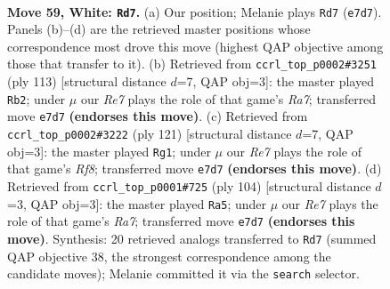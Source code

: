 \documentclass[11pt]{article}
\begin{document}
\clearpage

\begin{figure}[p]\centering
\begin{subfigure}{0.46\textwidth}\centering
\resizebox{\linewidth}{!}{%
\newchessgame
\chessboard[
  setfen={5rk1/4R3/P7/8/8/7K/8/8 w - - 3 59},
  showmover=false,
  pgfstyle=straightmove, color=movearrow, markmove={e7-d7}
]}
\caption{}
\end{subfigure}\hfill
\begin{subfigure}{0.46\textwidth}\centering
\resizebox{\linewidth}{!}{%
\newchessgame
\chessboard[
  setfen={8/8/8/5k1p/7P/8/r7/6RK b - - 4 57},
  showmover=false,
  pgfstyle=straightmove, color=movearrow, markmove={a2-b2}
]}
\caption{}
\end{subfigure}
\\[4pt]
\begin{subfigure}{0.46\textwidth}\centering
\resizebox{\linewidth}{!}{%
\newchessgame
\chessboard[
  setfen={4K3/4R1P1/8/8/1p1k4/8/8/5r2 b - - 20 61},
  showmover=false,
  pgfstyle=straightmove, color=movearrow, markmove={f1-g1}
]}
\caption{}
\end{subfigure}\hfill
\begin{subfigure}{0.46\textwidth}\centering
\resizebox{\linewidth}{!}{%
\newchessgame
\chessboard[
  setfen={8/R7/3rk3/6p1/6P1/8/6K1/8 w - - 3 53},
  showmover=false,
  pgfstyle=straightmove, color=movearrow, markmove={a7-a5}
]}
\caption{}
\end{subfigure}
\caption{\textbf{Move 59, White: \texttt{Rd7}.} (a) Our position; Melanie plays \texttt{Rd7} (\texttt{e7d7}). Panels (b)--(d) are the retrieved master positions whose correspondence most drove this move (highest QAP objective among those that transfer to it). (b) Retrieved from \texttt{ccrl\_top\_p0002\#3251} (ply 113) [structural distance $d$=7, QAP obj=3]: the master played \texttt{Rb2}; under $\mu$ our \emph{Re7} plays the role of that game's \emph{Ra7}; transferred move \texttt{e7d7} \textbf{(endorses this move)}. (c) Retrieved from \texttt{ccrl\_top\_p0002\#3222} (ply 121) [structural distance $d$=7, QAP obj=3]: the master played \texttt{Rg1}; under $\mu$ our \emph{Re7} plays the role of that game's \emph{Rf8}; transferred move \texttt{e7d7} \textbf{(endorses this move)}. (d) Retrieved from \texttt{ccrl\_top\_p0001\#725} (ply 104) [structural distance $d$=3, QAP obj=3]: the master played \texttt{Ra5}; under $\mu$ our \emph{Re7} plays the role of that game's \emph{Ra7}; transferred move \texttt{e7d7} \textbf{(endorses this move)}. Synthesis: 20 retrieved analogs transferred to \texttt{Rd7} (summed QAP objective 38, the strongest correspondence among the candidate moves); Melanie committed it via the \texttt{search} selector.}
\label{fig:thought-m116}
\end{figure}
\end{document}
